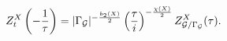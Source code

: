 \begin{equation}
Z^X_t\left(-\frac{1}{\tau}\right)=\vert\Gamma_{\cal G}\vert^{-\frac{b_2(X)}{2}}
\left(
\frac{\tau}{i}
\right)^{-\frac{\chi(X)}{2}}
Z_{{\cal G}/\Gamma_{\cal G}}^X(\tau).
\label{m-o}
\end{equation}


